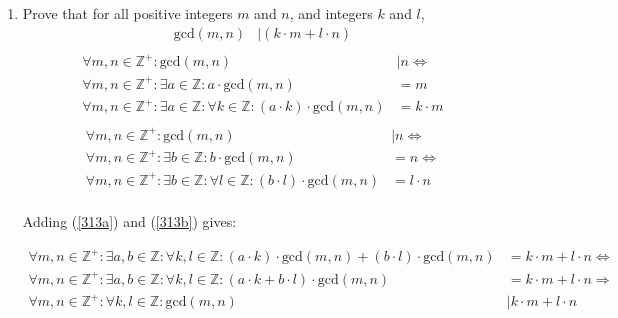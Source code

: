 \documentclass[10pt,\jkfside,a4paper]{article}
\begin{document}
\begin{enumerate}
\item Prove that for all positive integers $m$ and $n$, and integers $k$ and $l$, 
\begin{equation}
\begin{split}
\text{gcd}(m,n)&|(k\cdot m + l\cdot n)\\
\end{split}
\end{equation}
\begin{equation}\label{313a}
\begin{split}
\forall m, n \in \mathbb{Z}^+: \text{gcd}(m,n)&| n\Longleftrightarrow\\
\forall m, n \in \mathbb{Z}^+: \exists a \in \mathbb{Z}: a \cdot \text{gcd}(m,n) &= m\\
\forall m, n \in \mathbb{Z}^+: \exists a \in \mathbb{Z}: \forall k \in \mathbb{Z}: (a\cdot k)\cdot \text{gcd}(m,n) &= k\cdot m\\
\end{split}
\end{equation}
\begin{equation}\label{313b}
\begin{split}
\forall m, n \in \mathbb{Z}^+: \text{gcd}(m,n)&| n\Longleftrightarrow\\
\forall m, n \in \mathbb{Z}^+: \exists b \in \mathbb{Z}: b \cdot \text{gcd}(m,n) &= n\Longleftrightarrow\\
\forall m, n \in \mathbb{Z}^+: \exists b \in \mathbb{Z}: \forall l \in \mathbb{Z}: (b\cdot l)\cdot \text{gcd}(m,n) &= l\cdot n\\
\end{split}
\end{equation}
\begin{center}
Adding (\ref{313a}) and (\ref{313b}) gives:
\end{center}
\begin{equation}
\begin{split}
\forall m, n \in \mathbb{Z}^+: \exists a, b \in \mathbb{Z}: \forall k, l \in \mathbb{Z}: (a\cdot k)\cdot \text{gcd}(m,n) + (b\cdot l) \cdot \text{gcd}(m,n) &= k\cdot m + l\cdot n \Longleftrightarrow\\
\forall m, n \in \mathbb{Z}^+: \exists a, b \in \mathbb{Z}: \forall k, l \in \mathbb{Z}: (a\cdot k + b\cdot l) \cdot \text{gcd}(m,n) &= k\cdot m + l\cdot n \Longrightarrow\\
\forall m, n \in \mathbb{Z}^+: \forall k, l \in \mathbb{Z}: \text{gcd}(m,n) &| k\cdot m + l\cdot n\\
\end{split}
\end{equation}



\end{enumerate}
\end{document}
